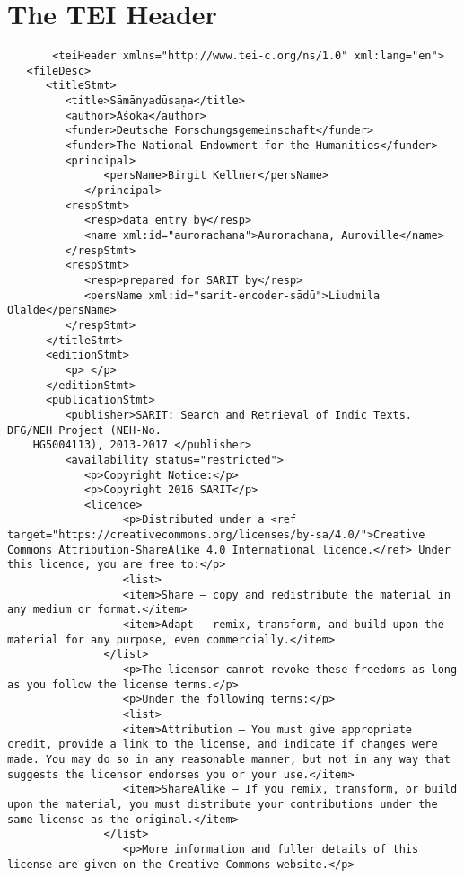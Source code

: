 \documentclass[article,12pt,a4paper]{memoir}%
\begin{document}
	 \chapter{The TEI Header}
	 \begin{verbatim}
       <teiHeader xmlns="http://www.tei-c.org/ns/1.0" xml:lang="en">
   <fileDesc>
      <titleStmt>
         <title>Sāmānyadūṣaṇa</title>
         <author>Aśoka</author>
         <funder>Deutsche Forschungsgemeinschaft</funder>
         <funder>The National Endowment for the Humanities</funder>
         <principal>
	           <persName>Birgit Kellner</persName>
	        </principal>
         <respStmt>
            <resp>data entry by</resp>
            <name xml:id="aurorachana">Aurorachana, Auroville</name>
         </respStmt>
         <respStmt>
            <resp>prepared for SARIT by</resp>
            <persName xml:id="sarit-encoder-sādū">Liudmila Olalde</persName>
         </respStmt>
      </titleStmt>
      <editionStmt>
         <p> </p>
      </editionStmt>
      <publicationStmt>
         <publisher>SARIT: Search and Retrieval of Indic Texts. DFG/NEH Project (NEH-No.
	HG5004113), 2013-2017 </publisher>
         <availability status="restricted">
            <p>Copyright Notice:</p>
            <p>Copyright 2016 SARIT</p>
            <licence> 
	              <p>Distributed under a <ref target="https://creativecommons.org/licenses/by-sa/4.0/">Creative Commons Attribution-ShareAlike 4.0 International licence.</ref> Under this licence, you are free to:</p>
	              <list>
                  <item>Share — copy and redistribute the material in any medium or format.</item>
                  <item>Adapt — remix, transform, and build upon the material for any purpose, even commercially.</item>
               </list>
	              <p>The licensor cannot revoke these freedoms as long as you follow the license terms.</p>
	              <p>Under the following terms:</p>
	              <list>
                  <item>Attribution — You must give appropriate credit, provide a link to the license, and indicate if changes were made. You may do so in any reasonable manner, but not in any way that suggests the licensor endorses you or your use.</item>
                  <item>ShareAlike — If you remix, transform, or build upon the material, you must distribute your contributions under the same license as the original.</item>
               </list>
	              <p>More information and fuller details of this license are given on the Creative Commons website.</p>

\end{verbatim}
\end{document}
